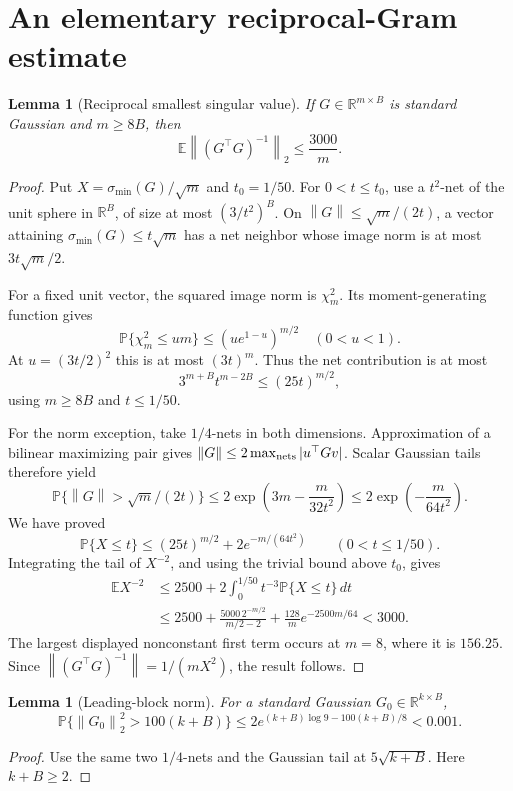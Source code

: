 \documentclass[11pt]{article}
\newtheorem{lemma}[theorem]{Lemma}
\theoremstyle{definition}
\newcommand{\R}{\mathbb R}
\newcommand{\E}{\mathbb E}
\newcommand{\Prob}{\mathbb P}
\newcommand{\norm}[1]{\left\lVert#1\right\rVert}
\begin{document}
\section{An elementary reciprocal-Gram estimate}\label{sec:gram}
\begin{lemma}[Reciprocal smallest singular value]\label{lem:inversegram}
If $G\in\R^{m\times B}$ is standard Gaussian and $m\ge8B$, then
\begin{equation}\label{eq:inversegram}
\E\norm{(G^\top G)^{-1}}_2\le\frac{3000}{m}.
\end{equation}
\end{lemma}
\begin{proof}
Put $X=\sigma_{\min}(G)/\sqrt m$ and $t_0=1/50$. For $0<t\le t_0$, use a $t^2$-net of the unit sphere in $\R^B$, of size at most $(3/t^2)^B$. On $\norm G\le\sqrt m/(2t)$, a vector attaining $\sigma_{\min}(G)\le t\sqrt m$ has a net neighbor whose image norm is at most $3t\sqrt m/2$.

For a fixed unit vector, the squared image norm is $\chi_m^2$. Its moment-generating function gives
\[
\Prob\{\chi_m^2\le u m\}\le(u e^{1-u})^{m/2}\quad(0<u<1).
\]
At $u=(3t/2)^2$ this is at most $(3t)^m$. Thus the net contribution is at most
\[
3^{m+B}t^{m-2B}\le(25t)^{m/2},
\]
using $m\ge8B$ and $t\le1/50$.

For the norm exception, take $1/4$-nets in both dimensions. Approximation of a bilinear maximizing pair gives $\norm G\le2\max_{\rm nets}|u^\top Gv|$. Scalar Gaussian tails therefore yield
\[
\Prob\{\norm G>\sqrt m/(2t)\}
\le2\exp\left(3m-\frac{m}{32t^2}\right)
\le2\exp\left(-\frac{m}{64t^2}\right).
\]
We have proved
\begin{equation}\label{eq:smallball}
\Prob\{X\le t\}\le(25t)^{m/2}+2e^{-m/(64t^2)}\qquad(0<t\le1/50).
\end{equation}
Integrating the tail of $X^{-2}$, and using the trivial bound above $t_0$, gives
\begin{align*}
\E X^{-2}
&\le2500+2\int_0^{1/50}t^{-3}\Prob\{X\le t\}\,dt\\
&\le2500+\frac{5000\,2^{-m/2}}{m/2-2}
+\frac{128}{m}e^{-2500m/64}<3000.
\end{align*}
The largest displayed nonconstant first term occurs at $m=8$, where it is $156.25$. Since $\norm{(G^\top G)^{-1}}=1/(mX^2)$, the result follows.
\end{proof}

\begin{lemma}[Leading-block norm]\label{lem:topnorm}
For a standard Gaussian $G_0\in\R^{k\times B}$,
\[
\Prob\{\norm{G_0}_2^2>100(k+B)\}
\le2e^{(k+B)\log9-100(k+B)/8}<0.001.
\]
\end{lemma}
\begin{proof}
Use the same two $1/4$-nets and the Gaussian tail at $5\sqrt{k+B}$. Here $k+B\ge2$.
\end{proof}
\end{document}
